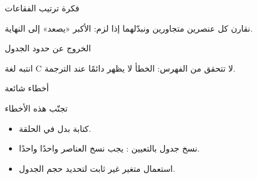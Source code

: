 \documentclass[aspectratio=169, 11pt, t, xcolor={table}]{beamer}
\begin{document}
\begin{frame}{فكرة ترتيب الفقاعات}
    \vspace{0.5cm}
    \begin{center}
    \end{center}
    \vspace{0.3cm}
    نقارن كل عنصرين متجاورين ونبدّلهما إذا لزم: الأكبر «يصعد» إلى النهاية.
\end{frame}

\begin{frame}{الخروج عن حدود الجدول}
    \begin{center}
    \begin{minipage}{0.62\textwidth}
    \end{minipage}
    \end{center}
    \vspace{0.3cm}
    \begin{obox}{\faExclamationTriangle\quad انتبه}
        لغة \textenglish{C} لا تتحقق من الفهرس: الخطأ لا يظهر دائمًا عند الترجمة.
    \end{obox}
\end{frame}



\begin{frame}{أخطاء شائعة}
    \begin{obox}{\faExclamationTriangle\quad تجنّب هذه الأخطاء}
        \begin{itemize}
            \item كتابة  بدل  في الحلقة.
            \item نسخ جدول بالتعيين : يجب نسخ العناصر واحدًا واحدًا.
            \item استعمال متغير غير ثابت لتحديد حجم الجدول.
        \end{itemize}
    \end{obox}
\end{frame}
\end{document}
